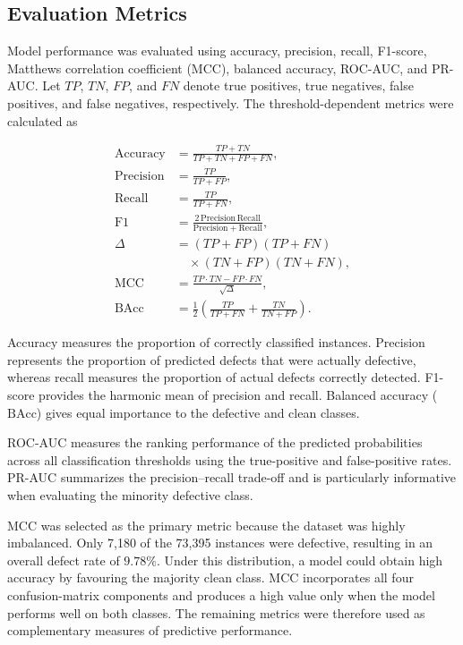 \documentclass[conference]{IEEEtran}
\begin{document}
\subsection{Evaluation Metrics}
\label{subsec:evaluation-metrics}

Model performance was evaluated using accuracy, precision, recall,
F1-score, Matthews correlation coefficient (MCC), balanced accuracy,
ROC-AUC, and PR-AUC. Let \(TP\), \(TN\), \(FP\), and \(FN\) denote
true positives, true negatives, false positives, and false negatives,
respectively. The threshold-dependent metrics were calculated as

\begin{align}
\mathrm{Accuracy}
&=
\frac{TP+TN}{TP+TN+FP+FN},
\\
\mathrm{Precision}
&=
\frac{TP}{TP+FP},
\\
\mathrm{Recall}
&=
\frac{TP}{TP+FN},
\\
\mathrm{F1}
&=
\frac{
2\,\mathrm{Precision}\,\mathrm{Recall}
}{
\mathrm{Precision}+\mathrm{Recall}
},
\\
\Delta
&=
(TP+FP)(TP+FN)
\nonumber\\
&\quad\times(TN+FP)(TN+FN),
\nonumber\\
\mathrm{MCC}
&=
\frac{TP\cdot TN-FP\cdot FN}{\sqrt{\Delta}},
\\
\mathrm{BAcc}
&=
\frac{1}{2}
\left(
\frac{TP}{TP+FN}
+
\frac{TN}{TN+FP}
\right).
\end{align}

Accuracy measures the proportion of correctly classified instances.
Precision represents the proportion of predicted defects that were
actually defective, whereas recall measures the proportion of actual
defects correctly detected. F1-score provides the harmonic mean of
precision and recall. Balanced accuracy (\(\mathrm{BAcc}\)) gives equal
importance to the defective and clean classes.

ROC-AUC measures the ranking performance of the predicted probabilities
across all classification thresholds using the true-positive and
false-positive rates. PR-AUC summarizes the precision--recall trade-off
and is particularly informative when evaluating the minority defective
class.

MCC was selected as the primary metric because the dataset was highly
imbalanced. Only 7,180 of the 73,395 instances were defective, resulting
in an overall defect rate of \(9.78\%\). Under this distribution, a
model could obtain high accuracy by favouring the majority clean class.
MCC incorporates all four confusion-matrix components and produces a
high value only when the model performs well on both classes. The
remaining metrics were therefore used as complementary measures of
predictive performance.
\end{document}
